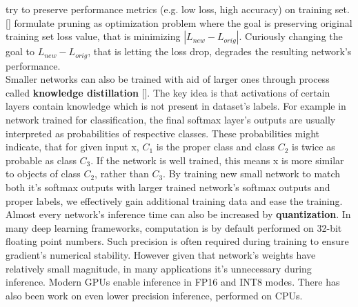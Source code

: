 \documentclass[../Main.tex]{subfiles}
\begin{document}
    try to preserve performance metrics (e.g. low loss, high accuracy) on training set. 
    [\cite{molchanov2016pruning}] formulate pruning as optimization problem where
    the goal is preserving original training set loss value, that is minimizing
    $|L_{new} - L_{orig}|$. Curiously changing the goal to $L_{new} - L_{orig}$,
    that is letting the loss drop, degrades the resulting network's performance.\\
    Smaller networks can also be trained with aid of larger ones through process called
    \textbf{knowledge distillation} [\cite{hinton2015distilling}]. 
    The key idea is that activations of certain layers
    contain knowledge which is not present in dataset's labels. For example in network 
    trained for classification, the final softmax layer's outputs are usually 
    interpreted as probabilities of respective classes. These probabilities might indicate,
    that for given input x, $C_1$ is the proper class and class $C_2$ is twice as probable 
    as class $C_3$. If the network is well trained, this means x is more similar to
    objects of class $C_2$, rather than $C_3$. By training new small network to match both
    it's softmax outputs with larger trained network's softmax outputs and proper labels,
    we effectively gain additional training data and ease the training.
    Almost every network's inference time can also be increased by \textbf{quantization}.
    In many deep learning frameworks, computation is by default performed on
    32-bit floating point numbers. Such precision is often required during training to 
    ensure gradient's numerical stability. However given that network's weights have
    relatively small magnitude, in many applications it's unnecessary during inference.
    Modern GPUs enable inference in FP16 and INT8 modes. There has also been work 
    on even lower precision inference, performed on CPUs. 
    
        


\biblio %
\end{document}
